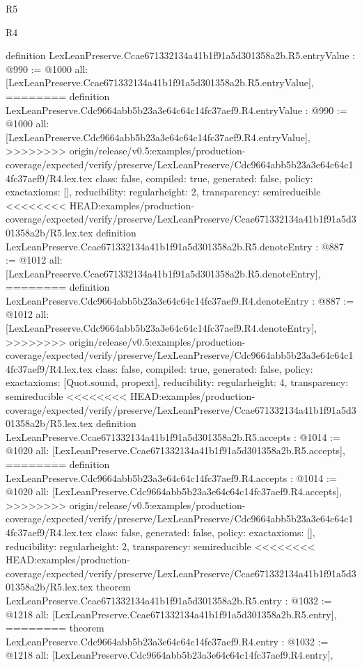 \begin{lexlean}{R5}
\begin{lexlean}{R4}
\begin{coremodule}
{{{{{{{{{{{{{{definition LexLeanPreserve.Ccae671332134a41b1f91a5d301358a2b.R5.entryValue : @990 := @1000 {
  all: [LexLeanPreserve.Ccae671332134a41b1f91a5d301358a2b.R5.entryValue],
========
definition LexLeanPreserve.Cdc9664abb5b23a3e64c64c14fc37aef9.R4.entryValue : @990 := @1000 {
  all: [LexLeanPreserve.Cdc9664abb5b23a3e64c64c14fc37aef9.R4.entryValue],
>>>>>>>> origin/release/v0.5:examples/production-coverage/expected/verify/preserve/LexLeanPreserve/Cdc9664abb5b23a3e64c64c14fc37aef9/R4.lex.tex
  class: false,
  compiled: true,
  generated: false,
  policy: exact{axioms: []},
  reducibility: regular{height: 2},
  transparency: semireducible
}
<<<<<<<< HEAD:examples/production-coverage/expected/verify/preserve/LexLeanPreserve/Ccae671332134a41b1f91a5d301358a2b/R5.lex.tex
definition LexLeanPreserve.Ccae671332134a41b1f91a5d301358a2b.R5.denoteEntry : @887 := @1012 {
  all: [LexLeanPreserve.Ccae671332134a41b1f91a5d301358a2b.R5.denoteEntry],
========
definition LexLeanPreserve.Cdc9664abb5b23a3e64c64c14fc37aef9.R4.denoteEntry : @887 := @1012 {
  all: [LexLeanPreserve.Cdc9664abb5b23a3e64c64c14fc37aef9.R4.denoteEntry],
>>>>>>>> origin/release/v0.5:examples/production-coverage/expected/verify/preserve/LexLeanPreserve/Cdc9664abb5b23a3e64c64c14fc37aef9/R4.lex.tex
  class: false,
  compiled: true,
  generated: false,
  policy: exact{axioms: [Quot.sound, propext]},
  reducibility: regular{height: 4},
  transparency: semireducible
}
<<<<<<<< HEAD:examples/production-coverage/expected/verify/preserve/LexLeanPreserve/Ccae671332134a41b1f91a5d301358a2b/R5.lex.tex
definition LexLeanPreserve.Ccae671332134a41b1f91a5d301358a2b.R5.accepts : @1014 := @1020 {
  all: [LexLeanPreserve.Ccae671332134a41b1f91a5d301358a2b.R5.accepts],
========
definition LexLeanPreserve.Cdc9664abb5b23a3e64c64c14fc37aef9.R4.accepts : @1014 := @1020 {
  all: [LexLeanPreserve.Cdc9664abb5b23a3e64c64c14fc37aef9.R4.accepts],
>>>>>>>> origin/release/v0.5:examples/production-coverage/expected/verify/preserve/LexLeanPreserve/Cdc9664abb5b23a3e64c64c14fc37aef9/R4.lex.tex
  class: false,
  generated: false,
  policy: exact{axioms: []},
  reducibility: regular{height: 2},
  transparency: semireducible
}
<<<<<<<< HEAD:examples/production-coverage/expected/verify/preserve/LexLeanPreserve/Ccae671332134a41b1f91a5d301358a2b/R5.lex.tex
theorem LexLeanPreserve.Ccae671332134a41b1f91a5d301358a2b.R5.entry : @1032 := @1218 {
  all: [LexLeanPreserve.Ccae671332134a41b1f91a5d301358a2b.R5.entry],
========
theorem LexLeanPreserve.Cdc9664abb5b23a3e64c64c14fc37aef9.R4.entry : @1032 := @1218 {
  all: [LexLeanPreserve.Cdc9664abb5b23a3e64c64c14fc37aef9.R4.entry],
}}}}}}}}}}}}}}}}}}}
\end{coremodule}
\end{lexlean}
\end{lexlean}

